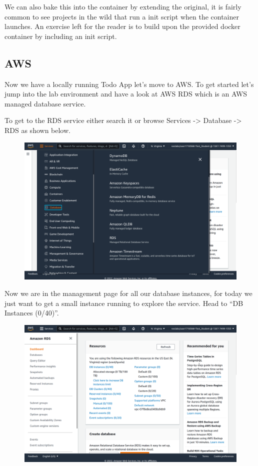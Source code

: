 \documentclass{csse4400}
\begin{document}
We can also bake this into the container by extending the original,
it is fairly common to see projects in the wild that run a init script when the container launches.
An exercise left for the reader is to build upon the provided docker container by including an init script.

\subsection{AWS}


Now we have a locally running Todo App let's move to AWS.
To get started let's jump into the lab environment and have a look at AWS RDS which is an AWS managed database service.


To get to the RDS service either search it or browse Services -> Database -> RDS as shown below.

\begin{figure}[H]
\includegraphics[width=\textwidth]{images/aws_1}
\end{figure}

Now we are in the management page for all our database instances,
for today we just want to get a small instance running to explore the service.
Head to ``DB Instances (0/40)''.

\begin{figure}[H]
\includegraphics[width=\textwidth]{images/aws_2}
\end{figure}
\end{document}
